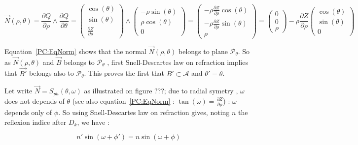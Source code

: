 \begin{equation}
	\vec{N}(\rho,\theta) 
	=  \frac{\partial Q}{\partial \rho} \wedge \frac{\partial Q}{\partial \theta}
	=   \begin{pmatrix} \cos(\theta)  \\  \sin(\theta)   \\    \frac{\partial Z}{\partial \rho}   \end{pmatrix}
            \wedge 
	   \begin{pmatrix} -\rho \sin(\theta)  \\ \rho \cos(\theta)   \\ 0 \end{pmatrix}
	=   \begin{pmatrix}  - \rho \frac{\partial Z}{\partial \rho}  \cos(\theta)  \\  -\rho \frac{\partial Z}{\partial \rho}  \sin(\theta)   \\  \rho     \end{pmatrix}
	=   \begin{pmatrix}  0 \\  0 \\  \rho     \end{pmatrix}
            - \rho \frac{\partial Z}{\partial \rho}   \begin{pmatrix}   \cos(\theta)  \\   \sin(\theta)   \\  0     \end{pmatrix}
		    \label{PC:EqNorm}
\end{equation}

Equation~\ref{PC:EqNorm} shows that the normal  $\vec{N}(\rho,\theta)$ belongs to plane $\mathcal{P}_{\theta}$. 
So as $\vec{N}(\rho,\theta)$ and $\vec{B}$  belongs to $\mathcal{P}_{\theta}$ , first Snell-Descartes law on refraction 
implies that  $\vec{B'}$ belongs also to  $\mathcal{P}_{\theta}$.  This proves the first
that $B' \subset  \mathcal{A}$ and $\theta'=\theta$.

Let write $\vec{N} = S_{ph}(\theta,\omega)$ as illustrated on  figure ???;  due to radial symetry  ,
$\omega$ does not  depends of $\theta$ (see also equation~\ref{PC:EqNorm} : $\tan(\omega)= \frac{\partial Z}{\partial \rho}$) :  $\omega$  depends only of $\phi$.
So using Snell-Descartes law on refraction gives, noting $n$ the reflexion indice after $D_k$, we have :

\begin{equation}
	n'  \sin(\omega + \phi') = n  \sin(\omega + \phi)
\end{equation}

